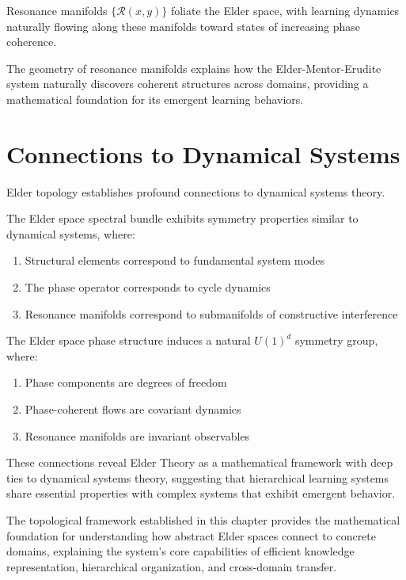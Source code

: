 \begin{theorem}
Resonance manifolds $\{\mathcal{R}(x, y)\}$ foliate the Elder space, with learning dynamics naturally flowing along these manifolds toward states of increasing phase coherence.
\end{theorem}

The geometry of resonance manifolds explains how the Elder-Mentor-Erudite system naturally discovers coherent structures across domains, providing a mathematical foundation for its emergent learning behaviors.

\section{Connections to Dynamical Systems}

Elder topology establishes profound connections to dynamical systems theory.

\begin{theorem}
The Elder space spectral bundle exhibits symmetry properties similar to dynamical systems, where:
\begin{enumerate}
    \item Structural elements correspond to fundamental system modes
    \item The phase operator corresponds to cycle dynamics
    \item Resonance manifolds correspond to submanifolds of constructive interference
\end{enumerate}
\end{theorem}

\begin{theorem}
The Elder space phase structure induces a natural $U(1)^d$ symmetry group, where:
\begin{enumerate}
    \item Phase components are degrees of freedom
    \item Phase-coherent flows are covariant dynamics
    \item Resonance manifolds are invariant observables
\end{enumerate}
\end{theorem}

These connections reveal Elder Theory as a mathematical framework with deep ties to dynamical systems theory, suggesting that hierarchical learning systems share essential properties with complex systems that exhibit emergent behavior.

The topological framework established in this chapter provides the mathematical foundation for understanding how abstract Elder spaces connect to concrete domains, explaining the system's core capabilities of efficient knowledge representation, hierarchical organization, and cross-domain transfer.